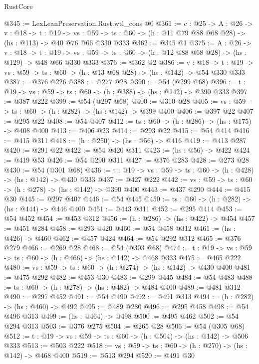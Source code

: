 \begin{lexlean}{RustCore}
\begin{coremodule}
@345 := LexLeanPreservation.Rust.wtl_cons @0
@361 := {c : @25} ->
  {A : @26} ->
  {v : @18} ->
  {t : @19} ->
  {vs : @59} -> {ts : @60} -> (h : @11 @79 @88 @68 @28) -> (hs : @113) -> @40 @76 @66 @330 @333
@362 := @345 @1
@375 := {A : @26} ->
  {v : @18} ->
  {t : @19} -> {vs : @59} -> {ts : @60} -> (h : @12 @88 @68 @28) -> (hs : @129) -> @48 @66 @330 @333
@376 := @362 @2
@386 := {v : @18} ->
  {t : @19} -> {vs : @59} -> {ts : @60} -> (h : @13 @68 @28) -> (hs : @142) -> @54 @330 @333
@387 := @376 @226
@388 := @277 @28
@390 := @54 (@299 @68)
@396 := {t : @19} -> {vs : @59} -> {ts : @60} -> (h : @388) -> (hs : @142) -> @390 @333
@397 := @387 @222
@399 := @54 (@297 @68)
@400 := @310 @28
@405 := {vs : @59} -> {ts : @60} -> (h : @282) -> (hs : @142) -> @399 @400
@406 := @397 @22
@407 := @295 @22
@408 := @54 @407
@412 := {ts : @60} -> (h : @286) -> (hs : @175) -> @408 @400
@413 := @406 @23
@414 := @293 @22
@415 := @54 @414
@416 := @415 @311
@418 := (h : @250) -> (hs : @56) -> @416
@419 := @413 @287
@420 := @291 @22
@422 := @54 @420 @311
@423 := (hs : @56) -> @422
@424 := @419 @53
@426 := @54 @290 @311
@427 := @376 @283
@428 := @273 @28
@430 := @54 (@301 @68)
@436 := {t : @19} -> {vs : @59} -> {ts : @60} -> (h : @428) -> (hs : @142) -> @430 @333
@437 := @427 @222
@442 := {vs : @59} -> {ts : @60} -> (h : @278) -> (hs : @142) -> @390 @400
@443 := @437 @290
@444 := @415 @30
@445 := @297 @407
@446 := @54 @445
@450 := {ts : @60} -> (h : @282) -> (hs : @444) -> @446 @400
@451 := @443 @311
@452 := @295 @414
@453 := @54 @452
@454 := @453 @312
@456 := (h : @286) -> (hs : @422) -> @454
@457 := @451 @284
@458 := @293 @420
@460 := @54 @458 @312
@461 := (hs : @426) -> @460
@462 := @457 @424
@464 := @54 @292 @312
@465 := @376 @279
@466 := @269 @28
@468 := @54 (@303 @68)
@474 := {t : @19} -> {vs : @59} -> {ts : @60} -> (h : @466) -> (hs : @142) -> @468 @333
@475 := @465 @222
@480 := {vs : @59} -> {ts : @60} -> (h : @274) -> (hs : @142) -> @430 @400
@481 := @475 @292
@482 := @453 @30
@483 := @299 @445
@484 := @54 @483
@488 := {ts : @60} -> (h : @278) -> (hs : @482) -> @484 @400
@489 := @481 @312
@490 := @297 @452
@491 := @54 @490
@492 := @491 @313
@494 := (h : @282) -> (hs : @460) -> @492
@495 := @489 @280
@496 := @295 @458
@498 := @54 @496 @313
@499 := (hs : @464) -> @498
@500 := @495 @462
@502 := @54 @294 @313
@503 := @376 @275
@504 := @265 @28
@506 := @54 (@305 @68)
@512 := {t : @19} -> {vs : @59} -> {ts : @60} -> (h : @504) -> (hs : @142) -> @506 @333
@513 := @503 @222
@518 := {vs : @59} -> {ts : @60} -> (h : @270) -> (hs : @142) -> @468 @400
@519 := @513 @294
@520 := @491 @30

\end{coremodule}
\end{lexlean}
